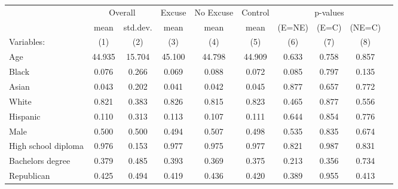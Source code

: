 \begin{table}[!ht]
\centering
\label{t:2-balance}
\vspace*{2mm}
\begin{threeparttable}
\begin{tabular}{lccccccccc}
\toprule
 & \multicolumn{2}{c}{Overall} & Excuse & No Excuse & Control & \multicolumn{3}{c}{p-values} \\
 \cmidrule(r){2-3} \cmidrule(lr){4-4} \cmidrule(lr){5-5} \cmidrule(lr){6-6} \cmidrule(lr){7-9} 
 & mean & std.dev. & mean & mean & mean & (E=NE) & (E=C) & (NE=C) \\
 \cmidrule(r){2-2} \cmidrule(lr){3-3} \cmidrule(lr){4-4} \cmidrule(lr){5-5} \cmidrule(l){6-6} \cmidrule(l){7-7} \cmidrule(l){8-8} \cmidrule(l){9-9}  
  Variables: & (1) & (2) & (3) & (4) & (5) & (6) & (7) & (8) \\ \midrule \midrule
Age & 44.935 & 15.704 & 45.100 & 44.798 & 44.909 & 0.633 & 0.758 & 0.857 \\
\addlinespace
Black & 0.076 & 0.266 & 0.069 & 0.088 & 0.072 & 0.085 & 0.797 & 0.135 \\
Asian & 0.043 & 0.202 & 0.041 & 0.042 & 0.045 & 0.877 & 0.657 & 0.772 \\
White & 0.821 & 0.383 & 0.826 & 0.815 & 0.823 & 0.465 & 0.877 & 0.556 \\
Hispanic & 0.110 & 0.313 & 0.113 & 0.107 & 0.111 & 0.644 & 0.854 & 0.776 \\
\addlinespace
Male & 0.500 & 0.500 & 0.494 & 0.507 & 0.498 & 0.535 & 0.835 & 0.674 \\
\addlinespace
High school diploma & 0.976 & 0.153 & 0.977 & 0.975 & 0.977 & 0.821 & 0.987 & 0.831 \\
Bachelors degree & 0.379 & 0.485 & 0.393 & 0.369 & 0.375 & 0.213 & 0.356 & 0.734 \\
\addlinespace
Republican & 0.425 & 0.494 & 0.419 & 0.436 & 0.420 & 0.389 & 0.955 & 0.413 \\
 \midrule
\bottomrule
\end{tabular}
\end{threeparttable} \end{table}
